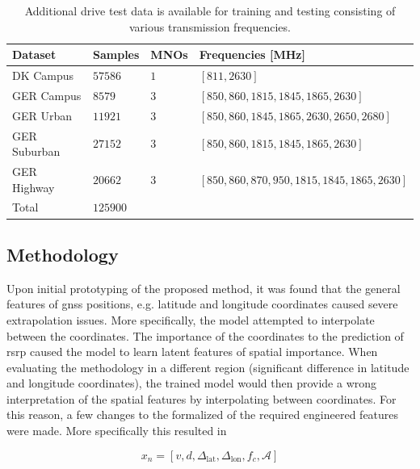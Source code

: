 \begin{table}[h]
\footnotesize
\begin{tabular}{@{}llll@{}}
\toprule
Dataset      & Samples & MNOs & Frequencies  [MHz]       \\ \midrule
DK Campus    & $57586$   & $1$    & $[811, 2630]$ \\
GER Campus   & $8579$    & $3$    & $[850, 860, 1815, 1845, 1865, 2630]$                   \\
GER Urban    & $11921$   & $3$    &  $[850, 860, 1845, 1865, 2630, 2650, 2680]$ \\
GER Suburban & $27152$   & $3$    &  $[850, 860, 1815, 1845, 1865,2630]$                   \\
GER Highway  & $20662$   & $3$    & $[850, 860, 870, 950, 1815, 1845, 1865,2630]$                    \\ \midrule
Total        & $125900$  &      &                     \\ \bottomrule
\end{tabular}
\vspace{1em}
\caption{Additional drive test data is available for training and testing consisting of various transmission frequencies.}\label{tab:drive_test_data_total}
\end{table}

\subsection{Methodology}\label{subsec:osm_methodology}

Upon initial prototyping of the proposed method, it was found that the general features of \gls{gnss} positions, e.g. latitude and longitude coordinates caused severe extrapolation issues. More specifically, the model attempted to interpolate between the coordinates. The importance of the coordinates to the prediction of \gls{rsrp} caused the model to learn latent features of spatial importance. When evaluating the methodology in a different region (significant difference in latitude and longitude coordinates), the trained model would then provide a wrong interpretation of the spatial features by interpolating between coordinates. For this reason, a few changes to the formalized of the required engineered features were made. More specifically this resulted in

\begin{equation}
    x_n = [v, d, \Delta_\text{lat}, \Delta_\text{lon},  f_c, \mathcal{A}]
\end{equation}

